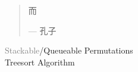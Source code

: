 \begin{frame}{}

  \pause
\end{frame}

\begin{frame}{}
  \begin{quote}
    \centerline{\LARGE {}而}

    \hfill --- 孔子
  \end{quote}

\end{frame}

\begin{frame}{}
  \begin{center}
    {\LARGE
      \textcolor{gray}{Stackable}/Queueable Permutations \\[0.50cm]
      Treesort Algorithm
    }
  \end{center}
\end{frame}
